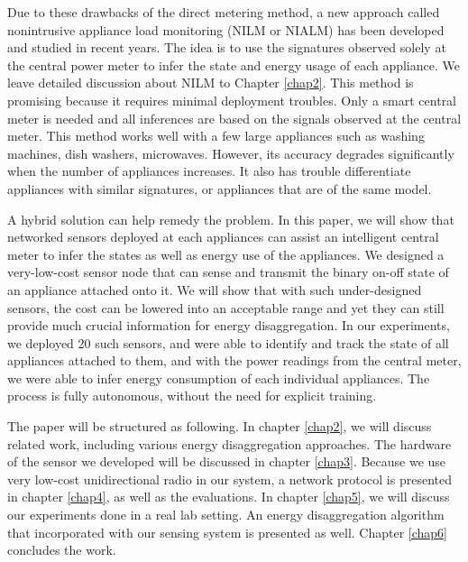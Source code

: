 Due to these drawbacks of the direct metering method, a new approach called nonintrusive appliance load monitoring (NILM or NIALM) has been developed and studied in recent years. The idea is to use the signatures observed solely at the central power meter to infer the state and energy usage of each appliance. We leave detailed discussion about NILM to Chapter \ref{chap2}. This method is promising because it requires minimal deployment troubles. Only a smart central meter is needed and all inferences are based on the signals observed at the central meter. This method works well with a few large appliances such as washing machines, dish washers, microwaves. However, its accuracy degrades significantly when the number of appliances increases. It also has trouble differentiate appliances with similar signatures, or appliances that are of the same model. 

A hybrid solution can help remedy the problem. In this paper, we will show that networked sensors deployed at each appliances can assist an intelligent central meter to infer the states as well as energy use of the appliances. We designed a very-low-cost sensor node that can sense and transmit the binary on-off state of an appliance attached onto it. We will show that with such under-designed sensors, the cost can be lowered into an acceptable range and yet they can still provide much crucial information for energy disaggregation. In our experiments, we deployed 20 such sensors, and were able to identify and track the state of all appliances attached to them, and with the power readings from the central meter, we were able to infer energy consumption of each individual appliances. The process is fully autonomous, without the need for explicit training. 

The paper will be structured as following. In chapter \ref{chap2}, we will discuss related work, including various energy disaggregation approaches. The hardware of the sensor we developed will be discussed in chapter \ref{chap3}. Because we use very low-cost unidirectional radio in our system, a network protocol is presented in chapter \ref{chap4}, as well as the evaluations. In chapter \ref{chap5}, we will discuss our experiments done in a real lab setting. An energy disaggregation algorithm that incorporated with our sensing system is presented as well. Chapter \ref{chap6} concludes the work. 


